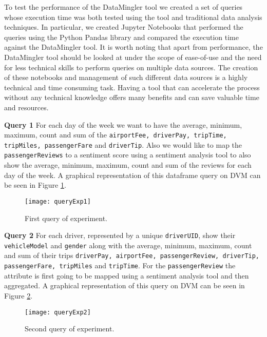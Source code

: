 To test the performance of the DataMingler tool we created a set of queries whose execution time was both tested using the tool and traditional data analysis techniques. In particular, we created Jupyter Notebooks that performed the queries using the Python Pandas library and compared the execution time against the DataMingler tool. It is worth noting that apart from performance, the DataMingler tool should be looked at under the scope of ease-of-use and the need for less technical skills to perform queries on multiple data sources. The creation of these notebooks and management of such different data sources is a highly technical and time consuming task. Having a tool that can accelerate the process without any technical knowledge offers many benefits and can save valuable time and resources.

\textbf{Query 1} For each day of the week we want to have the average, minimum, maximum, count and sum of the \texttt{airportFee, driverPay, tripTime, tripMiles, passengerFare} and \texttt{driverTip}. Also we would like to map the \texttt{passengerReviews} to a sentiment score using a sentiment analysis tool to also show the average, minimum, maximum, count and sum of the reviews for each day of the week. A graphical representation of this dataframe query on DVM can be seen in Figure \ref{queryExp1}.

\begin{center}
    \begin{figure}[h]
        \texttt{[image: queryExp1]}
        \caption{First query of experiment.}
        \label{queryExp1}
    \end{figure}
\end{center}

\textbf{Query 2} For each driver, represented by a unique \texttt{driverUID}, show their \texttt{vehicleModel} and \texttt{gender} along with the average, minimum, maximum, count and sum of their trips \texttt{driverPay, airportFee, passengerReview, driverTip, passengerFare, tripMiles} 
 and \texttt{tripTime}. For the \texttt{passengerReview} the attribute is first going to be mapped using a sentiment analysis tool and then aggregated. A graphical representation of this query on DVM can be seen in Figure \ref{queryExp2}.

\begin{center}
    \begin{figure}[h]
        \texttt{[image: queryExp2]}
        \caption{Second query of experiment.}
        \label{queryExp2}
    \end{figure}
\end{center}

